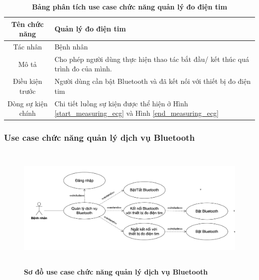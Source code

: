   \begin{table}[H]
    \caption{\bfseries \fontsize{12pt}{0pt}\selectfont Bảng phân tích use case chức năng quản lý đo điện tim}
    \centering
    \begin{tabularx}{0.9\textwidth}{|c|X|}
      \hline
      \textbf{Tên chức năng} & \textbf{Quản lý đo điện tim} \\
      \hline
      Tác nhân & Bệnh nhân \\
      \hline
      Mô tả & Cho phép người dùng thực hiện thao tác bắt đầu/ kết thúc quá trình đo của mình. \\
      \hline
      Điều kiện trước & Người dùng cần bật Bluetooth và đã kết nối với thiết bị đo điện tim \\
      \hline
      Dòng sự kiện chính & 
        Chi tiết luồng sự kiện được thể hiện ở Hình \ref{start_measuring_ecg} và Hình \ref{end_measuring_ecg} \\
      \hline
    \end{tabularx}
  \end{table}

\subsubsection{Use case chức năng quản lý dịch vụ Bluetooth}
  \begin{figure}[H]
    \centering
    \includegraphics[width=15cm,height=6cm]{Images/use_case/use_case_bluetooth.png}
    \caption[Sơ đồ use case chức năng quản lý dịch vụ Bluetooth]{\bfseries \fontsize{12pt}{0pt}
    \selectfont Sơ đồ use case chức năng quản lý dịch vụ Bluetooth}
    \label{use_case_bluetooth} %
  \end{figure}

